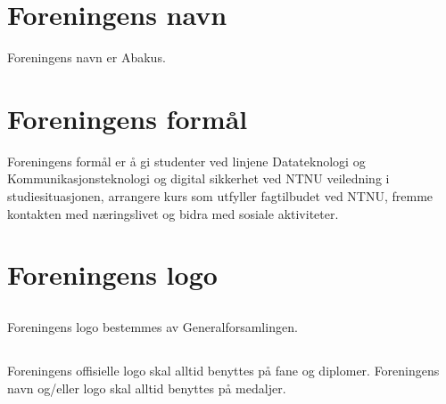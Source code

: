 \section{Foreningens navn}
Foreningens navn er Abakus.

\section{Foreningens formål}
Foreningens formål er å gi studenter ved linjene Datateknologi og
Kommunikasjonsteknologi og digital sikkerhet ved NTNU veiledning i
studiesituasjonen, arrangere kurs som utfyller fagtilbudet ved NTNU,
fremme kontakten med næringslivet og bidra med sosiale aktiviteter.

\section{Foreningens logo}

\subsection{}
Foreningens logo bestemmes av Generalforsamlingen.

\subsection{}
Foreningens offisielle logo skal alltid benyttes på fane og diplomer.
Foreningens navn og/eller logo skal alltid benyttes på medaljer.
